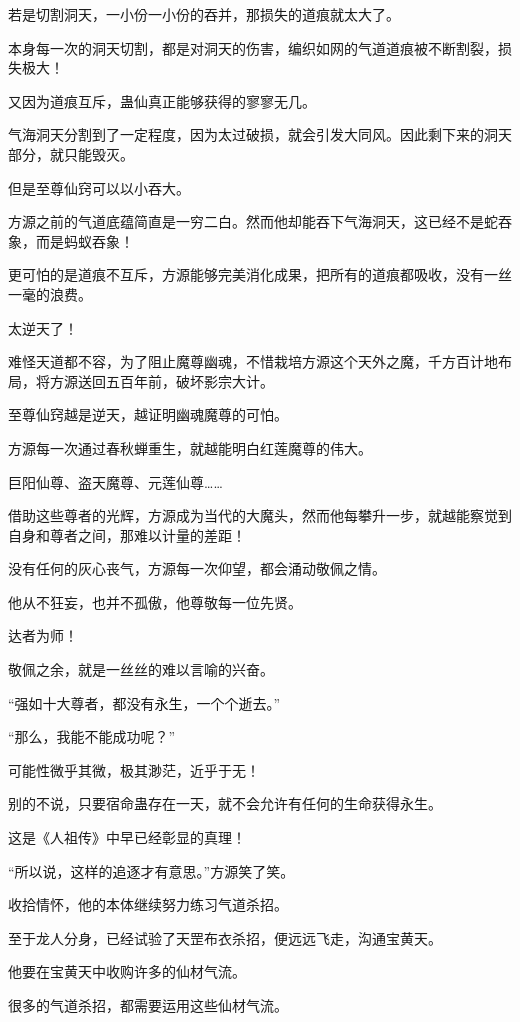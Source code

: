 \begin{this_body}
若是切割洞天，一小份一小份的吞并，那损失的道痕就太大了。

本身每一次的洞天切割，都是对洞天的伤害，编织如网的气道道痕被不断割裂，损失极大！

又因为道痕互斥，蛊仙真正能够获得的寥寥无几。

气海洞天分割到了一定程度，因为太过破损，就会引发大同风。因此剩下来的洞天部分，就只能毁灭。

但是至尊仙窍可以以小吞大。

方源之前的气道底蕴简直是一穷二白。然而他却能吞下气海洞天，这已经不是蛇吞象，而是蚂蚁吞象！

更可怕的是道痕不互斥，方源能够完美消化成果，把所有的道痕都吸收，没有一丝一毫的浪费。

太逆天了！

难怪天道都不容，为了阻止魔尊幽魂，不惜栽培方源这个天外之魔，千方百计地布局，将方源送回五百年前，破坏影宗大计。

至尊仙窍越是逆天，越证明幽魂魔尊的可怕。

方源每一次通过春秋蝉重生，就越能明白红莲魔尊的伟大。

巨阳仙尊、盗天魔尊、元莲仙尊……

借助这些尊者的光辉，方源成为当代的大魔头，然而他每攀升一步，就越能察觉到自身和尊者之间，那难以计量的差距！

没有任何的灰心丧气，方源每一次仰望，都会涌动敬佩之情。

他从不狂妄，也并不孤傲，他尊敬每一位先贤。

达者为师！

敬佩之余，就是一丝丝的难以言喻的兴奋。

“强如十大尊者，都没有永生，一个个逝去。”

“那么，我能不能成功呢？”

可能性微乎其微，极其渺茫，近乎于无！

别的不说，只要宿命蛊存在一天，就不会允许有任何的生命获得永生。

这是《人祖传》中早已经彰显的真理！

“所以说，这样的追逐才有意思。”方源笑了笑。

收拾情怀，他的本体继续努力练习气道杀招。

至于龙人分身，已经试验了天罡布衣杀招，便远远飞走，沟通宝黄天。

他要在宝黄天中收购许多的仙材气流。

很多的气道杀招，都需要运用这些仙材气流。


\end{this_body}
